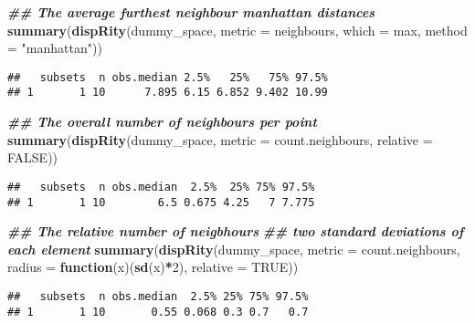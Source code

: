 \documentclass[
]{book}
\newenvironment{Shaded}{\begin{snugshade}}{\end{snugshade}}
\newcommand{\AttributeTok}[1]{\textcolor[rgb]{0.13,0.29,0.53}{#1}}
\newcommand{\ConstantTok}[1]{\textcolor[rgb]{0.56,0.35,0.01}{#1}}
\newcommand{\ControlFlowTok}[1]{\textcolor[rgb]{0.13,0.29,0.53}{\textbf{#1}}}
\newcommand{\DecValTok}[1]{\textcolor[rgb]{0.00,0.00,0.81}{#1}}
\newcommand{\DocumentationTok}[1]{\textcolor[rgb]{0.56,0.35,0.01}{\textbf{\textit{#1}}}}
\newcommand{\FunctionTok}[1]{\textcolor[rgb]{0.13,0.29,0.53}{\textbf{#1}}}
\newcommand{\NormalTok}[1]{#1}
\newcommand{\SpecialCharTok}[1]{\textcolor[rgb]{0.81,0.36,0.00}{\textbf{#1}}}
\newcommand{\StringTok}[1]{\textcolor[rgb]{0.31,0.60,0.02}{#1}}
\begin{document}
\begin{Shaded}
\begin{Highlighting}[]
\DocumentationTok{\#\# The average furthest neighbour manhattan distances}
\FunctionTok{summary}\NormalTok{(}\FunctionTok{dispRity}\NormalTok{(dummy\_space, }\AttributeTok{metric =}\NormalTok{ neighbours,}
                 \AttributeTok{which =}\NormalTok{ max, }\AttributeTok{method =} \StringTok{"manhattan"}\NormalTok{))}
\end{Highlighting}
\end{Shaded}

\begin{verbatim}
##   subsets  n obs.median 2.5%   25%   75% 97.5%
## 1       1 10      7.895 6.15 6.852 9.402 10.99
\end{verbatim}

\begin{Shaded}
\begin{Highlighting}[]
\DocumentationTok{\#\# The overall number of neighbours per point}
\FunctionTok{summary}\NormalTok{(}\FunctionTok{dispRity}\NormalTok{(dummy\_space, }\AttributeTok{metric =}\NormalTok{ count.neighbours,}
                 \AttributeTok{relative =} \ConstantTok{FALSE}\NormalTok{))}
\end{Highlighting}
\end{Shaded}

\begin{verbatim}
##   subsets  n obs.median  2.5%  25% 75% 97.5%
## 1       1 10        6.5 0.675 4.25   7 7.775
\end{verbatim}

\begin{Shaded}
\begin{Highlighting}[]
\DocumentationTok{\#\# The relative number of neigbhours}
\DocumentationTok{\#\# two standard deviations of each element}
\FunctionTok{summary}\NormalTok{(}\FunctionTok{dispRity}\NormalTok{(dummy\_space, }\AttributeTok{metric =}\NormalTok{ count.neighbours,}
                 \AttributeTok{radius =} \ControlFlowTok{function}\NormalTok{(x)(}\FunctionTok{sd}\NormalTok{(x)}\SpecialCharTok{*}\DecValTok{2}\NormalTok{),}
                 \AttributeTok{relative =} \ConstantTok{TRUE}\NormalTok{))}
\end{Highlighting}
\end{Shaded}

\begin{verbatim}
##   subsets  n obs.median  2.5% 25% 75% 97.5%
## 1       1 10       0.55 0.068 0.3 0.7   0.7
\end{verbatim}
\end{document}

